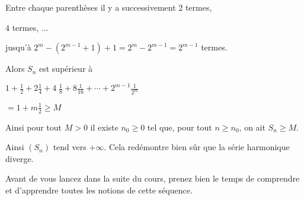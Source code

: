 \change
Entre chaque parenthèses il y a successivement $2$ termes,

\change 
$4$ termes, ...

\change
jusqu'à $2^m-(2^{m-1}+1)+1= 2^m-2^{m-1}=2^{m-1} $ termes.

\change
Alors $S_n$ est supérieur à 

$1+\frac{1}{2}+2 \frac{1}{4}+ 4\;\frac{1}{8}+ 8 \frac{1}{16}+\cdots +
2^{m-1} \frac{1}{2^m} $

\change
$= 1+m \frac{1}{2}\ge M  $

\change
Ainsi pour tout $M>0$ il existe $n_0 \ge 0$ tel que, pour tout $n \ge n_0$, on ait $S_n \ge M$.

Ainsi
$(S_n)$ tend vers $+\infty$. Cela redémontre bien sûr que la série harmonique diverge.

\diapo

Avant de vous lancez dans la suite du cours, prenez bien le temps de comprendre
et d'apprendre toutes les notions de cette séquence.



